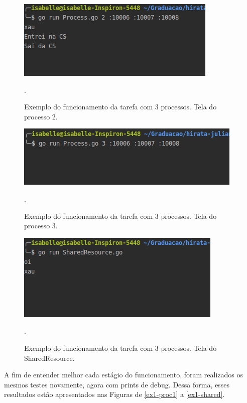\documentclass[conference]{IEEEtran}
\begin{document}
\begin{figure}[H]
\centering
\centerline{\includegraphics[scale=0.5]{imagens/ex1-proc2-clean.png}}
\caption{Exemplo do funcionamento da tarefa com 3 processos. Tela do processo 2.}.
\label{ex1-proc2-clean}
\end{figure}

\begin{figure}[H]
\centering
\centerline{\includegraphics[scale=0.5]{imagens/ex1-proc3-clean.png}}
\caption{Exemplo do funcionamento da tarefa com 3 processos. Tela do processo 3.}.
\label{ex1-proc3-clean}
\end{figure}

\begin{figure}[H]
\centering
\centerline{\includegraphics[scale=0.5]{imagens/ex1-shared-clean.png}}
\caption{Exemplo do funcionamento da tarefa com 3 processos. Tela do SharedResource.}.
\label{ex1-shared-clean}
\end{figure}
	
	A fim de entender melhor cada estágio do funcionamento, foram realizados os mesmos testes novamente, agora com prints de debug. Dessa forma, esses resultados estão apresentados nas Figuras de \ref{ex1-proc1} a \ref{ex1-shared}.
	
\end{document}
